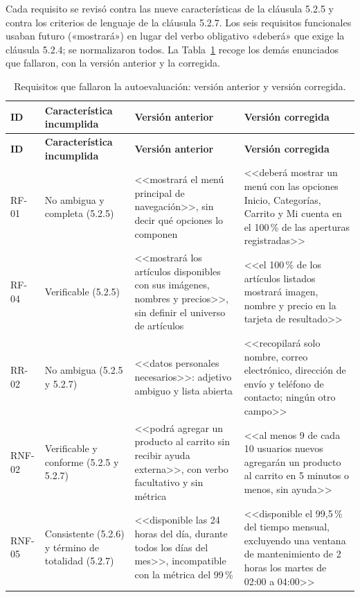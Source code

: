 \documentclass[11pt,a4paper]{article}
\begin{document}
Cada requisito se revisó contra las nueve características de la cláusula
5.2.5 y contra los criterios de lenguaje de la cláusula 5.2.7. Los seis
requisitos funcionales usaban futuro («mostrará») en lugar del verbo
obligativo «deberá» que exige la cláusula 5.2.4; se normalizaron todos.
La Tabla~\ref{tab:autoevaluacion} recoge los demás enunciados que fallaron,
con la versión anterior y la corregida.

\setlength{\tabcolsep}{4pt}
\begin{longtable}{>{\raggedright\arraybackslash}p{1.2cm}
                  >{\raggedright\arraybackslash}p{3.6cm}
                  >{\raggedright\arraybackslash}p{4.9cm}
                  >{\raggedright\arraybackslash}p{4.9cm}}
\caption{Requisitos que fallaron la autoevaluación: versión anterior y
versión corregida.}
\label{tab:autoevaluacion}\\
\toprule
\textbf{ID} & \textbf{Característica incumplida} &
\textbf{Versión anterior} & \textbf{Versión corregida} \\
\midrule
\endfirsthead
\toprule
\textbf{ID} & \textbf{Característica incumplida} &
\textbf{Versión anterior} & \textbf{Versión corregida} \\
\midrule
\endhead
\bottomrule
\endfoot
RF-01 & No ambigua y completa (5.2.5) &
<<mostrará el menú principal de navegación>>, sin decir qué opciones lo
componen &
<<deberá mostrar un menú con las opciones Inicio, Categorías, Carrito y Mi
cuenta en el 100\,\% de las aperturas registradas>> \\
RF-04 & Verificable (5.2.5) &
<<mostrará los artículos disponibles con sus imágenes, nombres y
precios>>, sin definir el universo de artículos &
<<el 100\,\% de los artículos listados mostrará imagen, nombre y precio
en la tarjeta de resultado>> \\
RR-02 & No ambigua (5.2.5 y 5.2.7) &
<<datos personales necesarios>>: adjetivo ambiguo y lista abierta &
<<recopilará solo nombre, correo electrónico, dirección de envío y
teléfono de contacto; ningún otro campo>> \\
RNF-02 & Verificable y conforme (5.2.5 y 5.2.7) &
<<podrá agregar un producto al carrito sin recibir ayuda externa>>, con
verbo facultativo y sin métrica &
<<al menos 9 de cada 10 usuarios nuevos agregarán un producto al carrito
en 5 minutos o menos, sin ayuda>> \\
RNF-05 & Consistente (5.2.6) y término de totalidad (5.2.7) &
<<disponible las 24 horas del día, durante todos los días del mes>>,
incompatible con la métrica del 99\,\% &
<<disponible el 99,5\,\% del tiempo mensual, excluyendo una ventana de
mantenimiento de 2 horas los martes de 02:00 a 04:00>> \\
\end{longtable}
\end{document}
